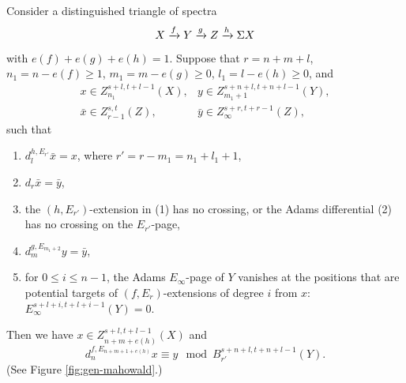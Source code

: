 \begin{theorem}\label{thm:gen-mahowald}
    Consider a distinguished triangle of spectra
    $$X\xrightarrow{f} Y\xrightarrow{g} Z\xrightarrow{h} \Sigma X$$
    with $e(f)+e(g)+e(h)=1$.
    Suppose that $r=n+m+l$, $n_1=n-e(f)\ge 1$, $m_1=m-e(g)\ge 0$, $l_1=l-e(h)\ge 0$, and
    $$\begin{array}{ll}
        x\in Z_{n_1}^{s+l,t+l-1}(X), & y\in Z_{m_1+1}^{s+n+l,t+n+l-1}(Y),\\
        \bar x\in Z_{r-1}^{s,t}(Z), & \bar y\in Z_\infty^{s+r,t+r-1}(Z),
    \end{array}$$
    such that
    \begin{enumerate}
        \item $d^{h,E_{r'}}_{l}\bar x=x$, where $r'=r-m_1=n_1+l_1+1$,
        \item $d_r \bar x=\bar y$,
            \item the $(h,E_{r'})$-extension in (1) has no crossing, or the Adams differential (2) has no crossing on the $E_{r'}$-page,
        \item $d^{g,E_{m_1+2}}_{m}y=\bar y$,
        \item for $0 \le i \le n-1$, the Adams $E_\infty$-page of $Y$ vanishes at the positions that are potential targets of $(f,E_r)$-extensions of degree $i$ from $x$: $E_\infty^{s+l+i, t+l+i-1}(Y) = 0$.
    \end{enumerate}
    Then we have $x\in Z_{n+m+e(h)}^{s+l,t+l-1}(X)$ and
    $$d^{f,E_{n+m+1+e(h)}}_{n}x\equiv y \mod B_{r'}^{s+n+l,t+n+l-1}(Y).$$
    (See Figure \ref{fig:gen-mahowald}.)
\end{theorem}
